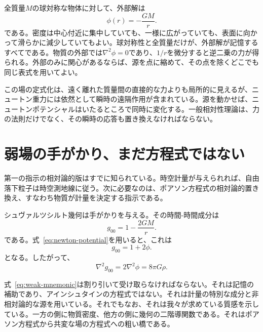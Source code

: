 全質量\(M\)の球対称な物体に対して、外部解は
\begin{equation}
 \phi(r)=-\frac{GM}{r}.
 \label{eq:newton-potential}
\end{equation}
である。密度は中心付近に集中していても、一様に広がっていても、表面に向かって滑らかに減少していてもよい。球対称性と全質量だけが、外部解が記憶するすべてである。物質の外部では\(\nabla^2\phi=0\)であり、\(1/r\)を微分すると逆二乗の力が得られる。外部のみに関心があるならば、源を点に縮めて、その点を除くどこでも同じ表式を用いてよい。

\begin{classroomqa}
\end{classroomqa}

この場の定式化は、遠く離れた質量間の直接的な力よりも局所的に見えるが、ニュートン重力には依然として瞬時の遠隔作用が含まれている。源を動かせば、ニュートンポテンシャルはいたるところで同時に変化する。一般相対性理論は、力の法則だけでなく、その瞬時の応答も置き換えなければならない。

\section{弱場の手がかり、まだ方程式ではない}

第一の指示の相対論的版はすでに知られている。時空計量が与えられれば、自由落下粒子は時空測地線に従う。次に必要なのは、ポアソン方程式の相対論的置き換え、すなわち物質が計量を決定する指示である。

シュヴァルツシルト幾何は手がかりを与える。その時間-時間成分は
\begin{equation}
 g_{00}=1-\frac{2GM}{r}.
\end{equation}
である。式~\eqref{eq:newton-potential}を用いると、これは
\begin{equation}
 g_{00}=1+2\phi.
\end{equation}
となる。したがって、
\begin{equation}
 \nabla^2g_{00}=2\nabla^2\phi=8\pi G\rho.
 \label{eq:weak-mnemonic}
\end{equation}

式~\eqref{eq:weak-mnemonic}は割り引いて受け取らなければならない。それは記憶の補助であり、アインシュタインの方程式ではない。それは計量の特別な成分と非相対論的な源を用いている。それでもなお、それは我々が求めている質感を示している。一方の側に物質密度、他方の側に幾何の二階導関数である。それはポアソン方程式から共変な場の方程式への粗い橋である。

